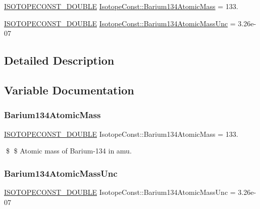 \begin{DoxyCompactItemize}
\item 
\mbox{\hyperlink{group___isotope_const-_macros_ga8f45a7272ce02c0b4c65c44636ed719a}{I\+S\+O\+T\+O\+P\+E\+C\+O\+N\+S\+T\+\_\+\+D\+O\+U\+B\+LE}} \mbox{\hyperlink{group___isotope_const-_barium-_ba134_gac7236196f4805b2c8591f8790b7df050}{Isotope\+Const\+::\+Barium134\+Atomic\+Mass}} = 133.
\item 
\mbox{\hyperlink{group___isotope_const-_macros_ga8f45a7272ce02c0b4c65c44636ed719a}{I\+S\+O\+T\+O\+P\+E\+C\+O\+N\+S\+T\+\_\+\+D\+O\+U\+B\+LE}} \mbox{\hyperlink{group___isotope_const-_barium-_ba134_gac9f77f6a5b9fdccd141c5173b03f31ba}{Isotope\+Const\+::\+Barium134\+Atomic\+Mass\+Unc}} = 3.\+26e-\/07
\end{DoxyCompactItemize}


\subsection{Detailed Description}


\subsection{Variable Documentation}
\mbox{\label{group___isotope_const-_barium-_ba134_gac7236196f4805b2c8591f8790b7df050}} 
\subsubsection{\texorpdfstring{Barium134\+Atomic\+Mass}{Barium134AtomicMass}}
{\footnotesize\ttfamily \mbox{\hyperlink{group___isotope_const-_macros_ga8f45a7272ce02c0b4c65c44636ed719a}{I\+S\+O\+T\+O\+P\+E\+C\+O\+N\+S\+T\+\_\+\+D\+O\+U\+B\+LE}} Isotope\+Const\+::\+Barium134\+Atomic\+Mass = 133.}

\$ \$ Atomic mass of Barium-\/134 in amu. \mbox{\label{group___isotope_const-_barium-_ba134_gac9f77f6a5b9fdccd141c5173b03f31ba}} 
\subsubsection{\texorpdfstring{Barium134\+Atomic\+Mass\+Unc}{Barium134AtomicMassUnc}}
{\footnotesize\ttfamily \mbox{\hyperlink{group___isotope_const-_macros_ga8f45a7272ce02c0b4c65c44636ed719a}{I\+S\+O\+T\+O\+P\+E\+C\+O\+N\+S\+T\+\_\+\+D\+O\+U\+B\+LE}} Isotope\+Const\+::\+Barium134\+Atomic\+Mass\+Unc = 3.\+26e-\/07}

